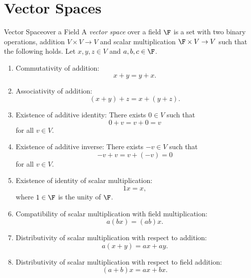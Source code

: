 \documentclass[linearalgebraI]{subfiles}
\begin{document}

    \section{Vector Spaces}

    \begin{definition}{Vector Space}{over a Field}
        A \emph{vector space} over a field $\F$ is a set with two binary operations, addition $V\times V\to V$ and scalar multiplication $\F\times V\to V$ such that the following holds. Let $x,y,z\in V$ and $a,b,c\in\F$.
        \begin{enumerate}
            \item Commutativity of addition: 
                \begin{equation*}
                    x+y=y+x.
                \end{equation*}
            \item Associativity of addition: 
                \begin{equation*}
                    (x+y)+z=x+(y+z).
                \end{equation*}
            \item Existence of additive identity: There exists $0\in V$ such that 
                \begin{equation*}
                    0+v=v+0=v 
                \end{equation*}
                for all $v\in V$.
            \item Existence of additive inverse: There exists $-v\in V$ such that 
                \begin{equation*}
                    -v+v=v+(-v)=0 
                \end{equation*}
                for all $v\in V$.
            \item Existence of identity of scalar multiplication: 
                \begin{equation*}
                    1x=x, 
                \end{equation*}
                where $1\in\F$ is the unity of $\F$.
            \item Compatibility of scalar multiplication with field multiplication: 
                \begin{equation*}
                    a(bx)=(ab)x.
                \end{equation*}
            \item Distributivity of scalar multiplication with respect to addition: 
                \begin{equation*}
                    a(x+y)=ax+ay.
                \end{equation*}
            \item Distributivity of scalar multiplication with respect to field addition: 
                \begin{equation*}
                    (a+b)x=ax+bx.
                \end{equation*}
        \end{enumerate}
    \end{definition}
\end{document}
